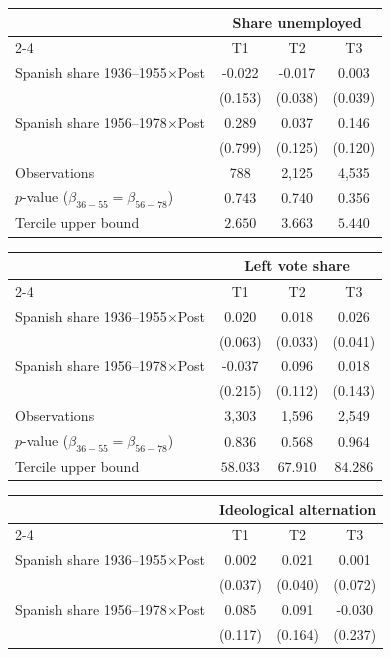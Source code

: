 \begin{table}[!h]
\begin{tabular*}{\textwidth}{l@{\extracolsep{\fill}}ccc}
& \multicolumn{3}{c}{Share unemployed} \\
\cmidrule(l){2-4}
& T1 & T2 & T3 \\
\hline
Spanish share 1936--1955\(\times\)Post & -0.022 & -0.017 & 0.003 \\
 & (0.153) & (0.038) & (0.039) \\
Spanish share 1956--1978\(\times\)Post & 0.289 & 0.037 & 0.146 \\
 & (0.799) & (0.125) & (0.120) \\
\addlinespace
Observations & 788 & 2,125 & 4,535 \\
\(p\)-value (\(\beta_{36{-}55}=\beta_{56{-}78}\)) & 0.743 & 0.740 & 0.356 \\
Tercile upper bound & \(2.650\) & \(3.663\) & \(5.440\) \\
\hline
\end{tabular*}
\begin{tabular*}{\textwidth}{l@{\extracolsep{\fill}}ccc}
& \multicolumn{3}{c}{Left vote share} \\
\cmidrule(l){2-4}
& T1 & T2 & T3 \\
\hline
Spanish share 1936--1955\(\times\)Post & 0.020 & 0.018 & 0.026 \\
 & (0.063) & (0.033) & (0.041) \\
Spanish share 1956--1978\(\times\)Post & -0.037 & 0.096 & 0.018 \\
 & (0.215) & (0.112) & (0.143) \\
\addlinespace
Observations & 3,303 & 1,596 & 2,549 \\
\(p\)-value (\(\beta_{36{-}55}=\beta_{56{-}78}\)) & 0.836 & 0.568 & 0.964 \\
Tercile upper bound & \(58.033\) & \(67.910\) & \(84.286\) \\
\hline
\end{tabular*}
\begin{tabular*}{\textwidth}{l@{\extracolsep{\fill}}ccc}
& \multicolumn{3}{c}{Ideological alternation} \\
\cmidrule(l){2-4}
& T1 & T2 & T3 \\
\hline
Spanish share 1936--1955\(\times\)Post & 0.002 & 0.021 & 0.001 \\
 & (0.037) & (0.040) & (0.072) \\
Spanish share 1956--1978\(\times\)Post & 0.085 & 0.091 & -0.030 \\
 & (0.117) & (0.164) & (0.237) \\

\end{tabular*}
\end{table}
